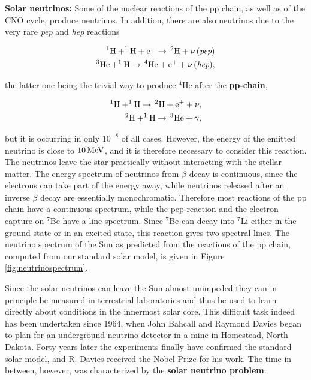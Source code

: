 \documentclass[a4paper,10pt]{article}
\begin{document}
{\noindent}\textbf{Solar neutrinos:} Some of the nuclear reactions of the pp chain, as well as of the CNO cycle, produce neutrinos. In addition, there are also neutrinos due to the very rare \textit{pep} and \textit{hep} reactions

\begin{align*}
    {\rm ^1H+^1H+e^- \rightarrow\,^2H+\nu\,(\textit{pep})} \\
    {\rm ^3He+^1H \rightarrow\,^4He+e^++\nu\,(\textit{hep})},
\end{align*}

{\noindent}the latter one being the trivial way to produce $^4$He after the \textbf{pp-chain},

\begin{align*}
    {\rm ^1H+^1H \rightarrow\,^2H+e^++\nu,} \\
    {\rm ^2H+^1H \rightarrow \,^3He+\gamma},
\end{align*}

{\noindent}but it is occurring in only $10^{-8}$ of all cases. However, the energy of the emitted neutrino is close to $10\,{\rm MeV}$, and it is therefore necessary to consider this reaction. The neutrinos leave the star practically without interacting with the stellar matter. The energy spectrum of neutrinos from $\beta$ decay is continuous, since the electrons can take part of the energy away, while neutrinos released after an inverse $\beta$ decay are essentially monochromatic. Therefore most reactions of the pp chain have a continuous spectrum, while the pep-reaction and the electron capture on $^7$Be have a line spectrum. Since $^7$Be can decay into $^7$Li either in the ground state or in an excited state, this reaction gives two spectral lines. The neutrino spectrum of the Sun as predicted from the reactions of the pp chain, computed from our standard solar model, is given in Figure \ref{fig:neutrinospectrum}.

{\noindent}Since the solar neutrinos can leave the Sun almost unimpeded they can in principle be measured in terrestrial laboratories and thus be used to learn directly about conditions in the innermost solar core. This difficult task indeed has been undertaken since 1964, when John Bahcall and Raymond Davies began to plan for an underground neutrino detector in a mine in Homestead, North Dakota. Forty years later the experiments finally have confirmed the standard solar model, and R. Davies received the Nobel Prize for his work. The time in between, however, was characterized by the \textbf{solar neutrino problem}.
\end{document}
